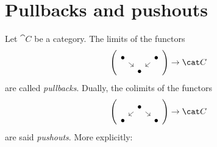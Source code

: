 
\section{Pullbacks and pushouts}

Let \(\cat C\) be a category. The limits of the functors
\[\left(\begin{tikzcd}[sep=tiny]
      \bullet \ar[dr] &         & \bullet \ar[dl] \\
      & \bullet &
    \end{tikzcd}\right) \to \cat C\]
are called {\em pullbacks}. Dually, the colimits of the functors
\[\left(\begin{tikzcd}[sep=tiny]
      & \bullet \ar[dl] \ar[dr] &         \\
      \bullet & & \bullet
    \end{tikzcd} \right) \to \cat C\] are said {\em pushouts}. More
explicitly:

